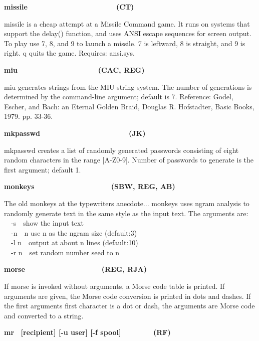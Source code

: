 {\sffamily\bfseries
missile\ \ \ \ \ \ \ \ \ \ \ \ \ \ \ \ \ \ \ \  \ \ (CT)}

\textsf{missile} is a cheap attempt at a Missile Command game. It runs
on systems that support the \textsf{delay()} function, and uses ANSI
escape sequences for screen output. To play use 7, 8, and 9 to launch a
missile. 7 is leftward, 8 is straight, and 9 is right. q quits the
game. Requires: \textsf{ansi.sys}. 

{\sffamily\bfseries
miu\ \ \ \ \ \ \ \ \ \ \ \ \ \ \ \ \ \ \ \ (CAC, REG)}

\textsf{miu} generates strings from the MIU string system. The number of
generations is determined by the command-line argument; default is 7.
Reference: Godel, Escher, and Bach: an Eternal Golden Braid, Douglas R.
Hofstadter, Basic Books, 1979. pp. 33-36. 

{\sffamily\bfseries
mkpasswd\ \ \ \ \ \ \ \ \ \ \ \ \ \ \ \ \ \ \ \  \ \ (JK)}

\textsf{mkpasswd} creates a list of randomly generated
passwords consisting of eight random characters in the
range [A-Z0-9]. Number of passwords to generate is the first argument;
default 1.

{\sffamily\bfseries
monkeys\ \ \ \ \ \ \ \ \ \ \ \ \ \ \ \  \ \ \ (SBW, REG, AB)}

The old monkeys at the typewriters anecdote... \textsf{monkeys} uses
ngram analysis to randomly generate text in the same
{\textquotesingle}style{\textquotesingle} as the input text. The
arguments are:\\
\ \ \textsf{{}-s}\ \ show the input text\\
\ \ \textsf{{}-n}\ \ n use n as the ngram size (default:3)\\
\ \ \textsf{{}-l n}\ \ output at about n lines (default:10)\\
\ \ \textsf{{}-r n}\ \ set random number seed to n

{\sffamily\bfseries
morse\ \ \ \ \ \ \ \ \ \ \ \ \ \ \ \ \ \  \ (REG, RJA)}

If \textsf{morse} is invoked without arguments, a Morse code table is printed. If arguments are given, the Morse
code conversion is printed in dots and dashes. If the first
argument{\textquotesingle}s first character is a dot or dash, the
arguments are Morse code and converted to a string.

{\sffamily\bfseries
mr \ \textrm{\textmd{[recipient] [-u user] [-f spool]\ \ \ \ \ \ \ \ 
}}(RF)}

